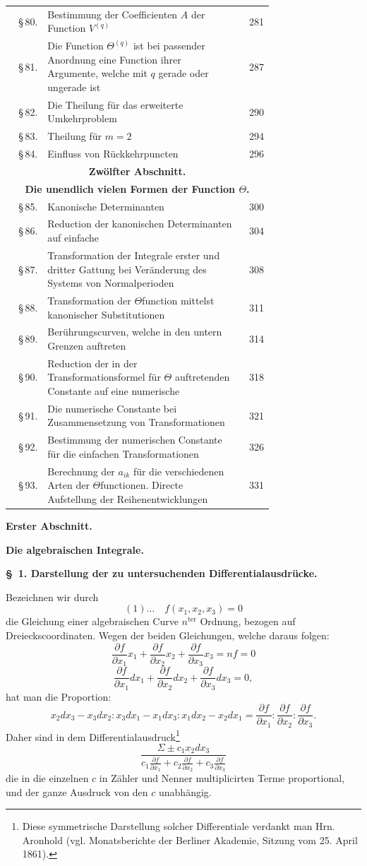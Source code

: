 \documentclass[10pt]{article}
\newcommand{\tocentry}[3]{\S\,#1 & #2 & #3\\}
\newcommand{\tocsec}[2]{\multicolumn{3}{c}{\bfseries #1}\\[-0.15em]\multicolumn{3}{c}{\bfseries #2}\\[0.25em]}
\begin{document}
{\begin{longtable}{@{}r@{\ }p{0.74\linewidth}@{\ }r@{}}
\tocentry{80.}{Bestimmung der Coefficienten $A$ der Function $V^{(q)}$}{281}
\tocentry{81.}{Die Function $\Theta^{(q)}$ ist bei passender Anordnung eine Function ihrer Argumente, welche mit $q$ gerade oder ungerade ist}{287}
\tocentry{82.}{Die Theilung für das erweiterte Umkehrproblem}{290}
\tocentry{83.}{Theilung für $m=2$}{294}
\tocentry{84.}{Einfluss von Rückkehrpuncten}{296}
\tocsec{Zwölfter Abschnitt.}{Die unendlich vielen Formen der Function $\Theta$.}
\tocentry{85.}{Kanonische Determinanten}{300}
\tocentry{86.}{Reduction der kanonischen Determinanten auf einfache}{304}
\tocentry{87.}{Transformation der Integrale erster und dritter Gattung bei Veränderung des Systems von Normalperioden}{308}
\tocentry{88.}{Transformation der $\Theta$function mittelst kanonischer Substitutionen}{311}
\tocentry{89.}{Berührungscurven, welche in den untern Grenzen auftreten}{314}
\tocentry{90.}{Reduction der in der Transformationsformel für $\Theta$ auftretenden Constante auf eine numerische}{318}
\tocentry{91.}{Die numerische Constante bei Zusammensetzung von Transformationen}{321}
\tocentry{92.}{Bestimmung der numerischen Constante für die einfachen Transformationen}{326}
\tocentry{93.}{Berechnung der $a_{ik}$ für die verschiedenen Arten der $\Theta$functionen. Directe Aufstellung der Reihenentwicklungen}{331}
\end{longtable}}

\begin{center}
{\large\bfseries Erster Abschnitt.}\par
{\Large\bfseries Die algebraischen Integrale.}
\end{center}

\begin{center}
{\bfseries \S\ 1. Darstellung der zu untersuchenden Differentialausdrücke.}
\end{center}

Bezeichnen wir durch
\[
(1)\ldots\quad f(x_1,x_2,x_3)=0
\]
die Gleichung einer algebraischen Curve $n^{\mathrm{ter}}$ Ordnung, bezogen auf Dreieckscoordinaten. Wegen der beiden Gleichungen, welche daraus folgen:
\[
\frac{\partial f}{\partial x_1}x_1+\frac{\partial f}{\partial x_2}x_2+\frac{\partial f}{\partial x_3}x_3=nf=0
\]
\[
\frac{\partial f}{\partial x_1}dx_1+\frac{\partial f}{\partial x_2}dx_2+\frac{\partial f}{\partial x_3}dx_3=0,
\]
hat man die Proportion:
\[
x_2dx_3-x_3dx_2:x_3dx_1-x_1dx_3:x_1dx_2-x_2dx_1
=\frac{\partial f}{\partial x_1}:\frac{\partial f}{\partial x_2}:\frac{\partial f}{\partial x_3}.
\]
Daher sind in dem Differentialausdruck\footnote{Diese symmetrische Darstellung solcher Differentiale verdankt man Hrn. Aronhold (vgl. Monatsberichte der Berliner Akademie, Sitzung vom 25. April 1861).}
\[
\frac{\Sigma\pm c_1x_2dx_3}{c_1\frac{\partial f}{\partial x_1}+c_2\frac{\partial f}{\partial x_2}+c_3\frac{\partial f}{\partial x_3}}
\]
die in die einzelnen $c$ in Zähler und Nenner multiplicirten Terme proportional, und der ganze Ausdruck von den $c$ unabhängig.
\end{document}
